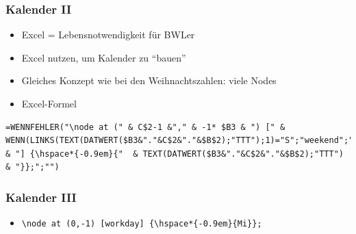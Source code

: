 \documentclass[14pt,ngerman]{beamer}
\begin{document}
\begin{frame}[containsverbatim]
\frametitle{Kalender II}

\begin{itemize}
	\item Excel = Lebensnotwendigkeit für BWLer
	\item Excel nutzen, um Kalender zu \enquote{bauen}
	\item Gleiches Konzept wie bei den Weihnachtszahlen: viele Nodes
	\item Excel-Formel
\end{itemize}

\begin{lstlisting}
=WENNFEHLER("\node at (" & C$2-1 &"," & -1* $B3 & ") [" & WENN(LINKS(TEXT(DATWERT($B3&"."&C$2&"."&$B$2);"TTT");1)="S";"weekend";"workday") & "] {\hspace*{-0.9em}{"  & TEXT(DATWERT($B3&"."&C$2&"."&$B$2);"TTT")   & "}};";"")
\end{lstlisting}
\end{frame}

\begin{frame}[containsverbatim]
\frametitle{Kalender III}

\begin{itemize}
	\item \lstinline|\node at (0,-1) [workday] {\hspace*{-0.9em}{Mi}};|
\end{itemize}\vspace*{-0.5cm}

\begin{center}
\end{center}
\end{frame}
\end{document}

